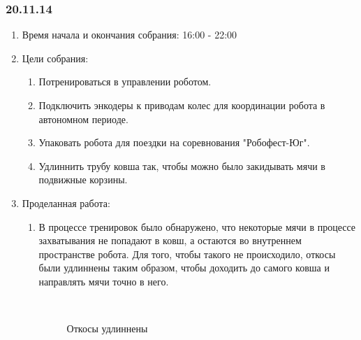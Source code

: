 \subsubsection{20.11.14}

\begin{enumerate}
	\item Время начала и окончания собрания:
	16:00 - 22:00
	\item Цели собрания:
	\begin{enumerate}
	  \item Потренироваться в управлении роботом.
	  
	  \item Подключить энкодеры к приводам колес для координации робота в автономном периоде.
	  
	  \item Упаковать робота для поездки на соревнования "Робофест-Юг".
	  
	  \item Удлиннить трубу ковша так, чтобы можно было закидывать мячи в подвижные корзины.
	  
    \end{enumerate}
	\item Проделанная работа:
	\begin{enumerate}
	  \item В процессе тренировок было обнаружено, что некоторые мячи в процессе захватывания не попадают в ковш, а остаются во внутреннем пространстве робота. Для того, чтобы такого не происходило, откосы были удлиннены таким образом, чтобы доходить до самого ковша и направлять мячи точно в него.
	  
	  \begin{figure}[H]
	  	\begin{minipage}[h]{0.2\linewidth}
	  		\center  
	  	\end{minipage}
	  	\begin{minipage}[h]{0.6\linewidth}
	  		\caption{Откосы удлиннены}
	  	\end{minipage}
	  \end{figure}
      

\end{enumerate}
\end{enumerate}
